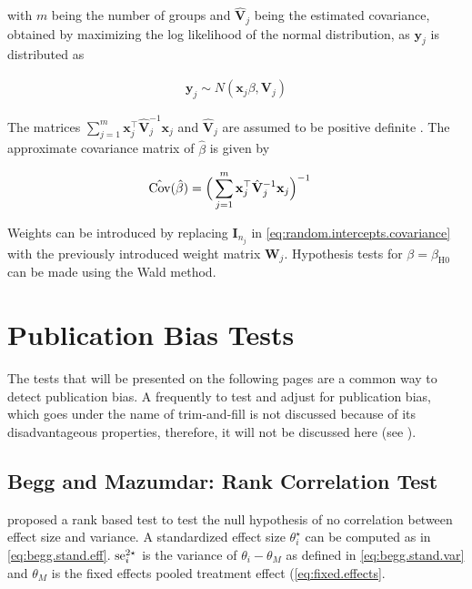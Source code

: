 \documentclass[11pt,a4paper,twoside]{book}\usepackage[]{graphicx}\usepackage[]{color}
\begin{document}
with $m$ being the number of groups and $\hat{\mathbf{V}}_j$ being the estimated covariance, obtained by maximizing the log likelihood of the normal distribution, as $\mathbf{y}_j$ is distributed as

\begin{align}
\mathbf{y}_j \sim N(\mathbf{x}_j \beta, \mathbf{V}_j)
\end{align}

The matrices $\sum_{j = 1}^m \mathbf{x}_j^\top \hat{\mathbf{V}}_j^{-1} \mathbf{x}_j$ and $\hat{\mathbf{V}}_j$ are assumed to be positive definite  . The approximate covariance matrix of $\hat{\beta}$ is given by

\begin{align}
\hat{\operatorname{Cov}}(\hat{\beta}) &= \Big( \sum_{j = 1}^m \mathbf{x}_j^\top \hat{\mathbf{V}}_j^{-1} \mathbf{x}_j \Big)^{-1}
\end{align}

Weights can be introduced by replacing $\mathbf{I}_{n_j}$ in \eqref{eq:random.intercepts.covariance} with the previously introduced weight matrix $\mathbf{W}_j$. Hypothesis tests for $\beta = \beta_\textrm{H0}$ can be made using the Wald method. 










\section{Publication Bias Tests}
The tests that will be presented on the following pages are a common way to detect publication bias. A frequently to test and adjust for publication bias, which goes under the name of trim-and-fill \citep{trimfill} is not discussed because of its disadvantageous properties, therefore, it will not be discussed here (see \eg \citet{Moreno.2009}).\\

\subsection{Begg and Mazumdar: Rank Correlation Test} \label{sec:Begg}
\citet{begg.ties} proposed a rank based test to test the null hypothesis of no correlation between effect size and variance.
A standardized effect size $\theta_i^\star$ can be computed as in \eqref{eq:begg.stand.eff}. $\operatorname{se}_i^{2\star}$ is the variance of $\theta_i - \theta_M$ as defined in \eqref{eq:begg.stand.var} and $\theta_M$ is the fixed effects pooled treatment effect (\eqref{eq:fixed.effects}. 
\end{document}

